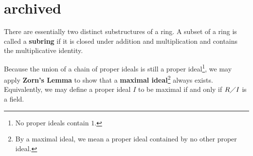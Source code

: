 \documentclass{report}
\begin{document}
\section{archived}

There are essentially two distinct substructures of a ring. A subset of a ring is called a \textbf{subring} if it is closed under addition and multiplication and contains the multiplicative identity. 

Because the union of a chain of proper ideals is still a proper ideal\footnote{No proper ideals contain $1$.}, we may apply \textbf{Zorn's Lemma} to show that a \textbf{maximal ideal}\footnote{By a maximal ideal, we mean a proper ideal contained by no other proper ideal.} always exists. Equivalently, we may define a proper ideal $I$ to be maximal if and only if $R\diagup I$ is a field.\\ 
\end{document}
